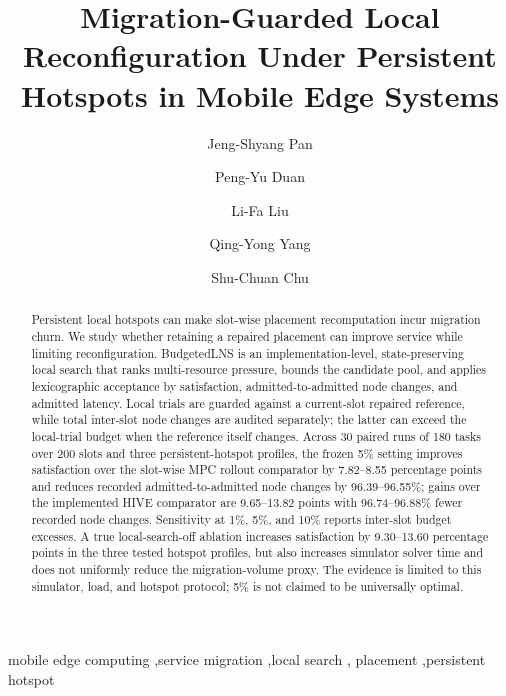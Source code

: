 \documentclass[preprint,12pt]{elsarticle}
\begin{document}
\begin{frontmatter}
\title{Migration-Guarded Local Reconfiguration Under Persistent Hotspots in Mobile Edge Systems}
\author[inst1,inst2]{Jeng-Shyang Pan}
\author[inst1]{Peng-Yu Duan}
\author[inst1]{Li-Fa Liu}
\author[inst1]{Qing-Yong Yang}
\author[inst3]{Shu-Chuan Chu}
\address[inst1]{College of Computer Science and Engineering, Shandong University of Science and Technology, Qingdao 266590, China}
\address[inst2]{Department of Information Management, Chaoyang University of Technology, Taichung 41349, Taiwan}
\address[inst3]{School of Artificial Intelligence, Nanjing University of Information Science and Technology, Nanjing 210044, China}
\begin{abstract}
Persistent local hotspots can make slot-wise placement recomputation incur migration churn. We study whether retaining a repaired placement can improve service while limiting reconfiguration. BudgetedLNS is an implementation-level, state-preserving local search that ranks multi-resource pressure, bounds the candidate pool, and applies lexicographic acceptance by satisfaction, admitted-to-admitted node changes, and admitted latency. Local trials are guarded against a current-slot repaired reference, while total inter-slot node changes are audited separately; the latter can exceed the local-trial budget when the reference itself changes. Across 30 paired runs of 180 tasks over 200 slots and three persistent-hotspot profiles, the frozen 5\% setting improves satisfaction over the slot-wise MPC rollout comparator by 7.82--8.55 percentage points and reduces recorded admitted-to-admitted node changes by 96.39--96.55\%; gains over the implemented HIVE comparator are 9.65--13.82 points with 96.74--96.88\% fewer recorded node changes. Sensitivity at 1\%, 5\%, and 10\% reports inter-slot budget excesses. A true local-search-off ablation increases satisfaction by 9.30--13.60 percentage points in the three tested hotspot profiles, but also increases simulator solver time and does not uniformly reduce the migration-volume proxy. The evidence is limited to this simulator, load, and hotspot protocol; 5\% is not claimed to be universally optimal.
\end{abstract}
\begin{keyword}
mobile edge computing \sep service migration \sep local search \sep
placement \sep persistent hotspot
\end{keyword}
\end{frontmatter}
\end{document}
